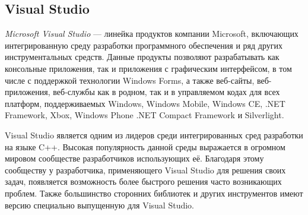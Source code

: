 \subsection{Visual Studio}
\label{sub:env_description:vs}
\textit{Microsoft Visual Studio} --- линейка продуктов компании Microsoft, включающих интегрированную среду разработки программного обеспечения и ряд других инструментальных средств. Данные продукты позволяют разрабатывать как консольные приложения, так и приложения с графическим интерфейсом, в том числе с поддержкой технологии Windows Forms, а также веб-сайты, веб-приложения, веб-службы как в родном, так и в управляемом кодах для всех платформ, поддерживаемых Windows, Windows Mobile, Windows CE, .NET Framework, Xbox, Windows Phone .NET Compact Framework и Silverlight.

Visual Studio является одним из лидеров среди интегрированных сред разработки на языке C++. Высокая популярность данной среды выражается в огромном мировом сообществе разработчиков использующих её. Благодаря этому сообществу у разработчика, применяющего Visual Studio для решения своих задач, появляется возможность более быстрого решения часто возникающих проблем. Также большинство сторонних библиотек и других инструментов имеют версию специально выпущенную для Visual Studio.

